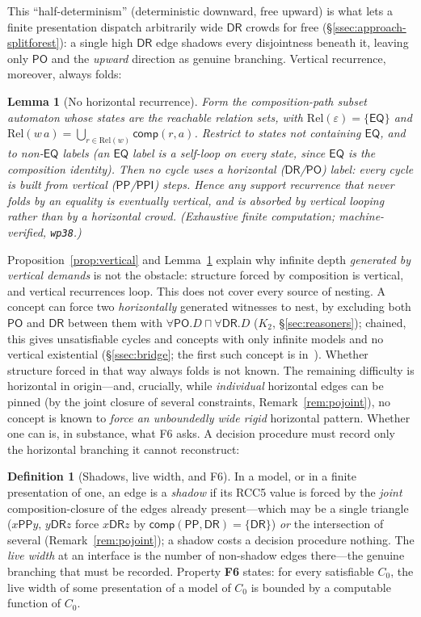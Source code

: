 \documentclass[11pt]{article}
\newcommand{\DR}{\mathsf{DR}}
\newcommand{\PO}{\mathsf{PO}}
\newcommand{\PP}{\mathsf{PP}}
\newcommand{\PPI}{\mathsf{PPI}}
\newcommand{\EQ}{\mathsf{EQ}}
\newcommand{\comp}{\ensuremath{\mathsf{comp}}}
\theoremstyle{plain}
\newtheorem{lemma}[theorem]{Lemma}
\theoremstyle{definition}
\newtheorem{definition}[theorem]{Definition}
\begin{document}
This ``half-determinism'' (deterministic downward, free upward) is what
lets a finite presentation dispatch arbitrarily wide $\DR$ crowds for free
(\S\ref{ssec:approach-splitforest}): a single high $\DR$ edge shadows every
disjointness beneath it, leaving only $\PO$ and the \emph{upward} direction
as genuine branching. Vertical recurrence, moreover, always folds:

\begin{lemma}[No horizontal recurrence]\label{lem:pathauto}
Form the composition-path subset automaton whose states are the reachable
relation sets, with $\mathrm{Rel}(\varepsilon)=\{\EQ\}$ and
$\mathrm{Rel}(w\,a)=\bigcup_{r\in\mathrm{Rel}(w)}\comp(r,a)$. Restrict to
states not containing $\EQ$, and to non-$\EQ$ labels (an $\EQ$ label is a
self-loop on every state, since $\EQ$ is the composition identity). Then no
cycle uses a \emph{horizontal} ($\DR$/$\PO$) label: every cycle is built
from vertical ($\PP$/$\PPI$) steps. Hence any support recurrence that never
folds by an equality is \emph{eventually vertical}, and is absorbed by
vertical looping rather than by a horizontal crowd. (Exhaustive finite
computation; machine-verified, \texttt{wp38}.)
\end{lemma}

Proposition~\ref{prop:vertical} and Lemma~\ref{lem:pathauto} explain why
infinite depth \emph{generated by vertical demands} is not the obstacle:
structure forced by composition is vertical, and vertical recurrences loop.
This does not cover every source of nesting. A concept can force two
\emph{horizontally} generated witnesses to nest, by excluding both $\PO$ and
$\DR$ between them with $\forall\PO.D\sqcap\forall\DR.D$ ($K_2$,
\S\ref{sec:reasoners}); chained, this gives unsatisfiable cycles and concepts
with only infinite models and no vertical existential
(\S\ref{ssec:bridge}; the first such concept is in~\cite{Wessel2003}). Whether structure forced in that way always folds is
not known. The remaining difficulty is horizontal in origin---and,
crucially, while \emph{individual} horizontal edges can be pinned (by the
joint closure of several constraints, Remark~\ref{rem:pojoint}), no concept
is known to \emph{force an unboundedly wide rigid} horizontal pattern.
Whether one can is, in substance, what F6 asks. A decision procedure must record only the
horizontal branching it cannot reconstruct:

\begin{definition}[Shadows, live width, and F6]\label{def:f6}
In a model, or in a finite presentation of one, an edge is a
\emph{shadow} if its RCC5 value is forced by the \emph{joint}
composition-closure of the edges already present---which may be a single
triangle ($x\mathbin{\PP}y,\,y\mathbin{\DR}z$ force $x\mathbin{\DR}z$ by
$\comp(\PP,\DR)=\{\DR\}$) \emph{or} the intersection of several
(Remark~\ref{rem:pojoint}); a shadow costs a decision procedure nothing. The
\emph{live width} at an interface is the number of non-shadow edges
there---the genuine branching that must be recorded.
Property \textbf{F6} states: for every satisfiable $C_0$, the live width
of some presentation of a model of $C_0$ is bounded by a computable
function of $C_0$.
\end{definition}
\end{document}

